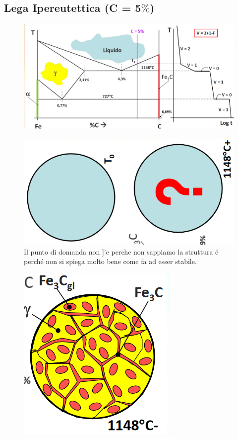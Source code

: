 \documentclass{article}
\begin{document}
{        \subsection{Lega Ipereutettica (C = 5$\%$)}
            \begin{figure}[h!]
                \centering
                \includegraphics[width=.8\linewidth]{L14 - C = 5 Diagramma di Stato e Traiettoria di Raffreddamento.png}
            \end{figure}
            \begin{figure}[h!]
                \centering
                \includegraphics[width=.7\linewidth]{L14 - C = 5 Strutture prima di 1148+.png}
                \caption{Il punto di domanda non ]'e perche non sappiamo la struttura \'e perch\'e non si spiega molto bene come fa ad esser stabile.}
            \end{figure}
            \begin{figure}[h!]
                \centering
                \includegraphics[width=.55\linewidth]{L14 - C = 5 Strutture da 1148+ a 1148-.png}

\end{figure}}
\end{document}
